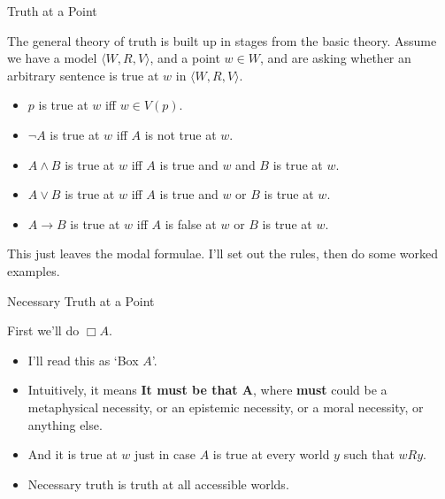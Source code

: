 \documentclass[
  ignorenonframetext,
]{beamer}
\providecommand{\tightlist}{%
  \setlength{\itemsep}{0pt}\setlength{\parskip}{0pt}}
\renewcommand{\,}{\text{, }}
\begin{document}
\begin{frame}{Truth at a Point}
\protect\hypertarget{truth-at-a-point}{}

The general theory of truth is built up in stages from the basic theory.
Assume we have a model \(\langle W, R, V\rangle\), and a point
\(w \in W\), and are asking whether an arbitrary sentence is true at
\(w\) in \(\langle W, R, V\rangle\).

\begin{itemize}
\tightlist
\item
  \(p\) is true at \(w\) iff \(w \in V(p)\).\pause
\item
  \(\neg A\) is true at \(w\) iff \(A\) is not true at \(w\).
\item
  \(A \wedge B\) is true at \(w\) iff \(A\) is true and \(w\) and \(B\)
  is true at \(w\).
\item
  \(A \vee B\) is true at \(w\) iff \(A\) is true and \(w\) or \(B\) is
  true at \(w\).
\item
  \(A \rightarrow B\) is true at \(w\) iff \(A\) is false at \(w\) or
  \(B\) is true at \(w\).\pause
\end{itemize}

This just leaves the modal formulae. I'll set out the rules, then do
some worked examples.

\end{frame}

\begin{frame}{Necessary Truth at a Point}
\protect\hypertarget{necessary-truth-at-a-point}{}

First we'll do \(\Box A\).

\begin{itemize}
\tightlist
\item
  I'll read this as `Box \(A\)'.\pause
\item
  Intuitively, it means \textbf{It must be that A}, where \textbf{must}
  could be a metaphysical necessity, or an epistemic necessity, or a
  moral necessity, or anything else.\pause
\item
  And it is true at \(w\) just in case \(A\) is true at every world
  \(y\) such that \(wRy\).
\item
  Necessary truth is truth at all accessible worlds.
\end{itemize}

\end{frame}
\end{document}
